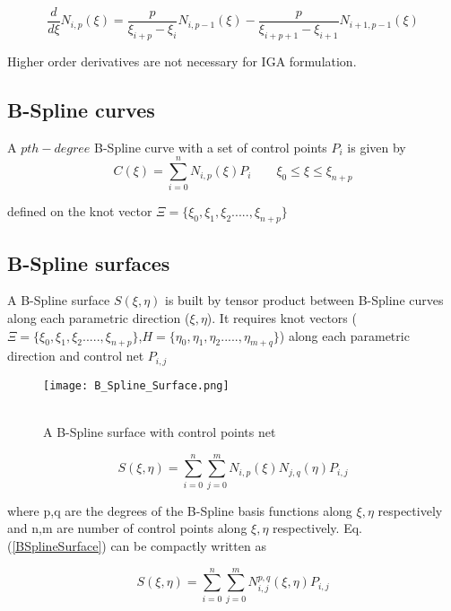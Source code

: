 \documentclass[11pt]{article}
\begin{document}
\begin{equation}
\frac{d}{d\xi}N_{i,p}(\xi) = \frac{p}{\xi_{i+p}-\xi_{i}} N_{i,p-1}(\xi) -
\frac{p}{\xi_{i+p+1}-\xi_{i+1}} N_{i+1,p-1}(\xi)
\end{equation}

\noindent
Higher order derivatives are not necessary for IGA formulation.

\subsection{B-Spline curves}

A $pth-degree$ B-Spline curve with a set of control points $P_i$ is given by
\begin{equation}
C(\xi) = \sum_{i=0}^{n} N_{i,p}(\xi) P_i \qquad \xi_0 \leq \xi \leq \xi_{n+p}
\end{equation}

\noindent
defined on the knot vector $\Xi = \{ \xi_0,\xi_1,\xi_2.....,\xi_{n+p}\}$

\subsection{B-Spline surfaces}
A B-Spline surface $S(\xi,\eta)$ is built by tensor product between B-Spline
curves along each parametric direction ($\xi,\eta$). It requires knot vectors
($\Xi = \{ \xi_0,\xi_1,\xi_2.....,\xi_{n+p}\}$,$H =
\{\eta_0,\eta_1,\eta_2.....,\eta_{m+q}\}$) along each parametric direction and
control net $P_{i,j}$
\begin{figure}[H]
	\begin{center}
		\texttt{[image: B\_Spline\_Surface.png]} 
		\caption{\\A B-Spline surface with control points net}\label{B_Spline_Surface}
	\end{center}	
\end{figure}


\begin{equation} \label{BSplineSurface}
S(\xi,\eta) = \sum_{i=0}^{n}\sum_{j=0}^{m} N_{i,p}(\xi) N_{j,q}(\eta) P_{i,j}
\end{equation}

\noindent
where
p,q are the degrees of the B-Spline basis functions along $\xi,\eta$
respectively and n,m are number of control points along $\xi,\eta$ respectively.
\noindent
Eq. (\ref{BSplineSurface}) can be compactly written as


\begin{equation} \label{BSplineSurface}
S(\xi,\eta) = \sum_{i=0}^{n}\sum_{j=0}^{m} N_{i,j}^{p,q}(\xi,\eta) P_{i,j}
\end{equation}
\end{document}
